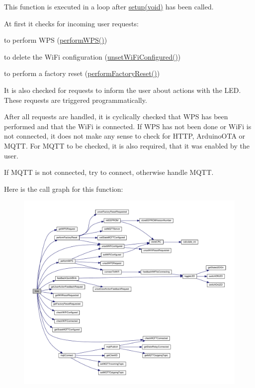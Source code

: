 This function is executed in a loop after \hyperlink{WIFIOnOff_8ino_a7dfd9b79bc5a37d7df40207afbc5431f}{setup(void)} has been called. 

At first it checks for incoming user requests\-:
\begin{DoxyItemize}
\item to perform W\-P\-S (\hyperlink{WIFIOnOff_8ino_aa51eb2a71952e54dba6130be21b3a1d7}{perform\-W\-P\-S()})
\item to delete the Wi\-Fi configuration (\hyperlink{WIFIOnOff_8ino_ac782bcb28cf6c4cf77d8a408fe02c2f9}{unset\-Wi\-Fi\-Configured()})
\item to perform a factory reset (\hyperlink{WIFIOnOff_8ino_afec1c2962185272a8c87843f95d205ad}{perform\-Factory\-Reset()})
\end{DoxyItemize}

It is also checked for requests to inform the user about actions with the L\-E\-D. These requests are triggered programmatically.

After all requests are handled, it is cyclically checked that W\-P\-S has been performed and that the Wi\-Fi is connected. If W\-P\-S has not been done or Wi\-Fi is not connected, it does not make any sense to check for H\-T\-T\-P, Arduino\-O\-T\-A or M\-Q\-T\-T. For M\-Q\-T\-T to be checked, it is also required, that it was enabled by the user.

If M\-Q\-T\-T is not connected, try to connect, otherwise handle M\-Q\-T\-T. 

Here is the call graph for this function\-:
\nopagebreak
\begin{figure}[H]
\begin{center}
\leavevmode
\includegraphics[width=350pt]{WIFIOnOff_8ino_a0b33edabd7f1c4e4a0bf32c67269be2f_cgraph}
\end{center}
\end{figure}


